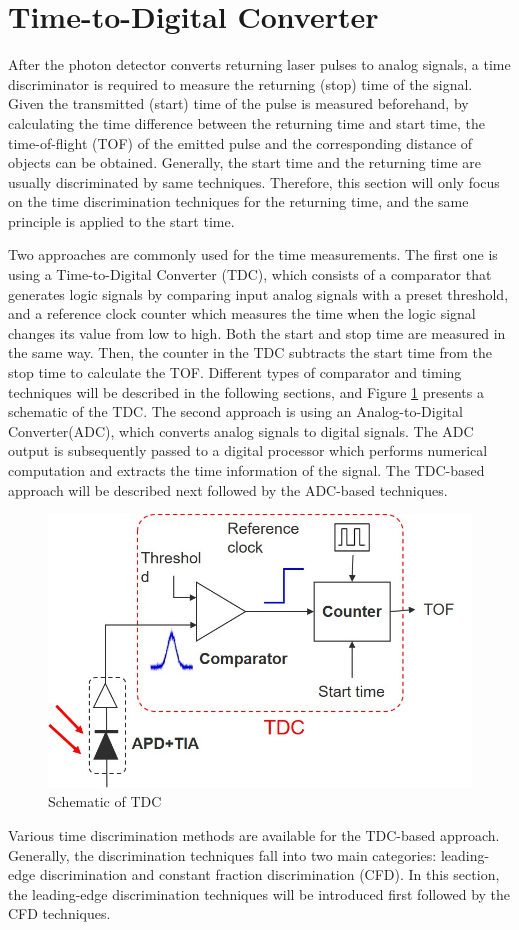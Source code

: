 \section{Time-to-Digital Converter}
After the photon detector converts returning laser pulses to analog signals, a time discriminator is required to measure the returning (stop) time of the signal. Given the transmitted (start) time of the pulse is measured beforehand, by calculating the time difference between the returning time and start time, the time-of-flight (TOF) of the emitted pulse and the corresponding distance of objects can be obtained. Generally, the start time and the returning time are usually discriminated by same techniques. Therefore, this section will only focus on the time discrimination techniques for the returning time, and the same principle is applied to the start time.\par 
Two approaches are commonly used for the time measurements. The first one is using a Time-to-Digital Converter (TDC), which consists of a comparator that generates logic signals by comparing input analog signals with a preset threshold, and a reference clock counter which measures the time when the logic signal changes its value from low to high. Both the start and stop time are measured in the same way. Then, the counter in the TDC subtracts the start time from the stop time to calculate the TOF. Different types of comparator and timing techniques will be described in the following sections, and Figure \ref{fig:TDC_schematic} presents a schematic of the TDC. The second approach is using an Analog-to-Digital Converter(ADC), which converts analog signals to digital signals. The ADC output is subsequently passed to a digital processor which performs numerical computation and extracts the time information of the signal. The TDC-based approach will be described next followed by the ADC-based techniques.\par
\begin{figure}[t!p]
\centering
\includegraphics[width=.8\textwidth]{figures/chapter3_TDC/schematic_TDC.jpg}
\caption{Schematic of TDC}
\label{fig:TDC_schematic}
\end{figure}
Various time discrimination methods are available for the TDC-based approach. Generally, the discrimination techniques fall into two main categories: leading-edge discrimination and constant fraction discrimination (CFD). In this section, the leading-edge discrimination techniques will be introduced first followed by the CFD techniques.\par

